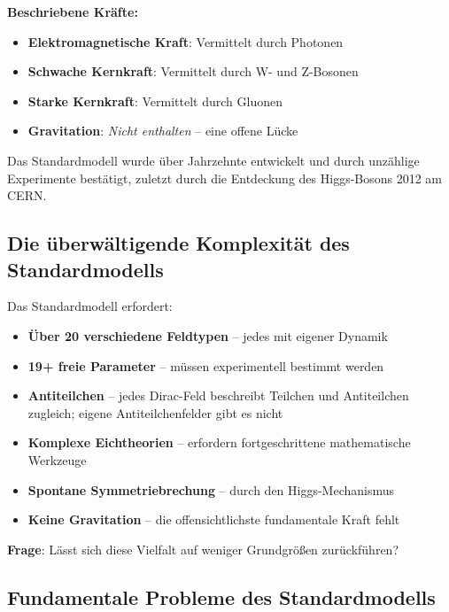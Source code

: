 	\textbf{Beschriebene Kräfte:}
	\begin{itemize}
		\item \textbf{Elektromagnetische Kraft}: Vermittelt durch Photonen
		\item \textbf{Schwache Kernkraft}: Vermittelt durch W- und Z-Bosonen
		\item \textbf{Starke Kernkraft}: Vermittelt durch Gluonen
		\item \textbf{Gravitation}: \emph{Nicht enthalten} -- eine offene Lücke
	\end{itemize}
	
	Das Standardmodell wurde über Jahrzehnte entwickelt und durch unzählige Experimente bestätigt, zuletzt durch die Entdeckung des Higgs-Bosons 2012 am CERN.
	
	\subsection{Die überwältigende Komplexität des Standardmodells}
	
	\begin{tcolorbox}[colback=red!5!white,colframe=red!75!black,title=Komplexität des Standardmodells]
		Das Standardmodell erfordert:
		\begin{itemize}
			\item \textbf{Über 20 verschiedene Feldtypen} -- jedes mit eigener Dynamik
			\item \textbf{19+ freie Parameter} -- müssen experimentell bestimmt werden
			\item \textbf{Antiteilchen} -- jedes Dirac-Feld beschreibt Teilchen und Antiteilchen zugleich; eigene Antiteilchenfelder gibt es nicht
			\item \textbf{Komplexe Eichtheorien} -- erfordern fortgeschrittene mathematische Werkzeuge
			\item \textbf{Spontane Symmetriebrechung} -- durch den Higgs-Mechanismus
			\item \textbf{Keine Gravitation} -- die offensichtlichste fundamentale Kraft fehlt
		\end{itemize}
		
		\textbf{Frage}: Lässt sich diese Vielfalt auf weniger Grundgrößen zurückführen?
	\end{tcolorbox}
	
	\subsection{Fundamentale Probleme des Standardmodells}
	
